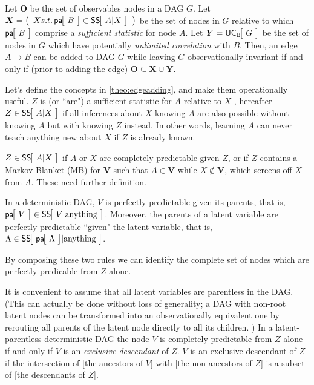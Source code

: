 \begin{theorem}\label{theo:edgeadding}
Let $\bm{O}$ be the set of observables nodes in a DAG $G$.
Let $\bm{X}=\lparens{X s.t. \NamedFunction{pa}{\!B\!}\in\NamedFunction{SS}{\!A|X\!}}$ be the set of nodes in $G$ relative to which $\NamedFunction{pa}{\!B\!}$ comprise a \emph{sufficient statistic} for node $A$.
Let $\bm{Y}=\NamedFunction{UC_{B}}{\!G\!}$ be the set of nodes in $G$ which have potentially \emph{unlimited correlation} with $B$.
Then, an edge $A\to B$ can be added to DAG $G$ while leaving $G$ observationally invariant if and only if (prior to adding the edge) $\bm{O}\subseteq \bm{X}\cup \bm{Y}$.
\end{theorem}

Let's define the concepts in \cref{theo:edgeadding}, and make them operationally useful. $Z$ is (or ``are") a sufficient statistic for $A$ relative to $X$ , hereafter $Z\in\NamedFunction{SS}{\!A|X\!}$ if all inferences about $X$ knowing $A$ are also possible without knowing $A$ but with knowing $Z$ instead. In other words, learning $A$ can never teach anything new about $X$ if $Z$ is already known. %

$Z\in\NamedFunction{SS}{\!A|X\!}$ if $A$ or $X$ are completely predictable given $Z$, or if $Z$ contains a Markov Blanket (MB) for $\bm{V}$ such that $A\in \bm{V}$ while $X\not\in \bm{V}$, 
which screens off $X$ from $A$. These need further definition.

In a deterministic DAG, $V$ is perfectly predictable given its parents, that is, $\NamedFunction{pa}{\!V\!}\in\NamedFunction{SS}{\!V|\text{anything}\!}$. Moreover, the parents of a latent variable are perfectly predictable ``given" the latent variable, that is, ${\Lambda\in\NamedFunction{SS}{\!\NamedFunction{pa}{\!\Lambda\!}|\text{anything}\!}}$. 

By composing these two rules we can identify the complete set of nodes which are perfectly predicable from $Z$ alone. 

It is convenient to assume that all latent variables are parentless in the DAG. (This can actually be done without loss of generality; a DAG with non-root latent nodes can be transformed into an observationally equivalent one by rerouting all parents of the latent node directly to all its children. ) In a latent-parentless deterministic DAG the node $V$ is completely predictable from $Z$ alone if and only if $V$ is an \emph{exclusive descendant} of $Z$. $V$ is an exclusive descendant of $Z$ if the intersection of [the ancestors of $V$] with [the non-ancestors of $Z$] is a subset of {[the descendants of $Z$]}. 
 

